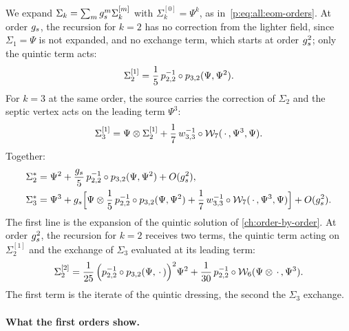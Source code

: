 We expand $\Sigma_k = \sum_m g_s^m \Sigma_k^{[m]}$ with $\Sigma_k^{[0]} = \Psi^k$, as in~\eqref{p:eq:all:eom-orders}.
At order $g_s$, the recursion for $k = 2$ has no correction from the lighter field, since $\Sigma_1 = \Psi$ is not expanded, and no exchange term, which starts at order $g_s^2$; only the quintic term acts:
\begin{equation}
  \label{ch3:eq:sigma2-1}
  \Sigma_2^{[1]}
    = \frac{1}{5} \, p_{2,2}^{-1} \circ p_{3,2}(\Psi, \Psi^2).
\end{equation}
For $k = 3$ at the same order, the source carries the correction of $\Sigma_2$ and the septic vertex acts on the leading term $\Psi^3$:
\begin{equation}
  \label{ch3:eq:sigma3-1}
  \Sigma_3^{[1]}
    = \Psi \otimes \Sigma_2^{[1]}
      + \frac{1}{7} \, w_{3,3}^{-1} \circ \mathcal{W}_{7}(\, \cdot \,, \Psi^3, \Psi).
\end{equation}
Together:
\begin{equation}
  \label{ch3:eq:first-orders}
  \begin{aligned}
    \Sigma_2^*
      &
      = \Psi^2
        + \frac{g_s}{5} \, p_{2,2}^{-1} \circ p_{3,2}(\Psi, \Psi^2)
        + O(g_s^2),
    \\
    \Sigma_3^*
      &
      = \Psi^3
        + g_s \Big[
          \Psi \otimes \frac{1}{5} \, p_{2,2}^{-1} \circ p_{3,2}(\Psi, \Psi^2)
          + \frac{1}{7} \, w_{3,3}^{-1} \circ \mathcal{W}_{7}(\, \cdot \,, \Psi^3, \Psi)
        \Big]
        + O(g_s^2).
  \end{aligned}
\end{equation}
The first line is the expansion of the quintic solution of \cref{ch:order-by-order}.
At order $g_s^2$, the recursion for $k = 2$ receives two terms, the quintic term acting on $\Sigma_2^{[1]}$ and the exchange of $\Sigma_3$ evaluated at its leading term:
\begin{equation}
  \label{ch3:eq:sigma2-2}
  \Sigma_2^{[2]}
    = \frac{1}{25} \, \Big( p_{2,2}^{-1} \circ p_{3,2}(\Psi, \, \cdot \,) \Big)^2 \Psi^2
      + \frac{1}{30} \, p_{2,2}^{-1} \circ \mathcal{W}_{6}(\Psi \otimes \, \cdot \,, \Psi^3).
\end{equation}
The first term is the iterate of the quintic dressing, the second the $\Sigma_3$ exchange.

\paragraph{What the first orders show.}

